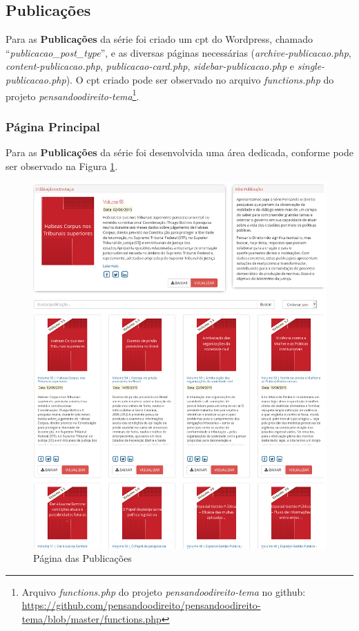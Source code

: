 \subsection{Publicações}
Para as \textbf{Publicações} da série \ppod foi criado um \gls{cpt} do Wordpress, chamado ``\textit{publicacao\_post\_type}'', e as diversas páginas necessárias (\textit{archive-publicacao.php}, \textit{content-publicacao.php}, \textit{publicacao-card.php}, \textit{sidebar-publicacao.php} e \textit{single-publicacao.php}). O \gls{cpt} criado pode ser observado no arquivo \textit{functions.php} do projeto \textit{pensandoodireito-tema}\footnote{Arquivo \textit{functions.php} do projeto \textit{pensandoodireito-tema} no github: \url{https://github.com/pensandoodireito/pensandoodireito-tema/blob/master/functions.php}}.

\subsubsection*{Página Principal}
Para as \textbf{Publicações} da série \ppod foi desenvolvida uma área dedicada, conforme pode ser observado na Figura \ref{fig:publicacoes-geral}.

\begin{figure}[Htb]%
	\begin{center}
		\includegraphics[scale=0.36]{./imagens/publicacoes-geral.png}%
	\end{center}%
	\caption{Página das Publicações\label{fig:publicacoes-geral}}%
\end{figure}%


